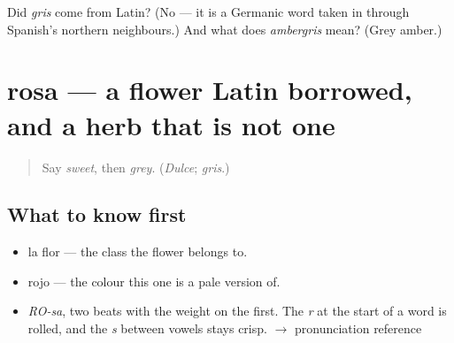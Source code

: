 \begin{tcolorbox}[breakable,colback=teal!4,colframe=teal!35!black,title={Before you move on}]
Did \emph{gris} come from Latin? (No — it is a Germanic word taken in through Spanish's northern neighbours.) And what does \emph{ambergris} mean? (Grey amber.)
\end{tcolorbox}
\section[rosa]{rosa — a flower Latin borrowed, and a herb that is not one}

\label{lesson:ES-C372-rosa}



\begin{quote}
Say \emph{sweet}, then \emph{grey}. (\emph{Dulce}; \emph{gris}.)
\end{quote}

\subsection*{What to know first}
\begin{itemize}
\raggedright
  \item la flor — the class the flower belongs to.
  \item rojo — the colour this one is a pale version of.
\end{itemize}

\begin{sounds}
\begin{itemize}
\raggedright
  \item \emph{RO-sa}, two beats with the weight on the first. The \emph{r} at the start of a word is rolled, and the \emph{s} between vowels stays crisp. $\to$ pronunciation reference
\end{itemize}
\end{sounds}

